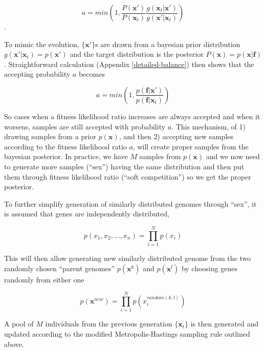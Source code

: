 \documentclass{article}
\begin{document}
\begin{equation}
  \label{mcmcsampling1}
  a = min(1, \frac{P(\mathbf{x}')}{P(\mathbf{x}_t)} \frac{g(\mathbf{x}_t|\mathbf{x}')}{g(\mathbf{x}'|\mathbf{x}_t)})
\end{equation}.

To mimic the evolution, $\{\mathbf{x}'\}$s are drawn from a bayesian prior distribution $g(\mathbf{x}'|\mathbf{x}_t) = p(\mathbf{x}')$ and the target distribution is the posterior $P(\mathbf{x}) = p(\mathbf{x}|\mathbf{f})$. Straightforward calculation (Appendix \ref{detailed-balance}) then shows that the accepting probability $a$ becomes

\begin{equation}
  \label{mcmcsampling2}
  a = min(1, \frac{p(\mathbf{f}|\mathbf{x}')}{p(\mathbf{f}|\mathbf{x}_t)})
\end{equation}

So cases when a fitness likelihood ratio increases are always accepted and when it worsens, samples are still accepted with probability $a$. This mechanism, of 1) drawing samples from a prior $p(\mathbf{x})$, and then 2) accepting new samples according to the fitness likelihood ratio $a$, will create proper samples from the bayesian posterior. In practice, we have $M$ samples from $p(\mathbf{x})$ and we now need to generate more samples (``sex'') having the same distribution and then put them through fitness likelihood ratio (``soft competition'') so we get the proper posterior.
 
To further simplify generation of similarly distributed genomes through ``sex'', it is assumed that genes are independently distributed,

\begin{equation}
  p(x_1,x_2,...,x_n) = \prod_{i=1}^{N}p(x_i)
\end{equation}

This will then allow generating new similarly distributed genome from the two randomly chosen ``parent genomes'' $p(\mathbf{x}^k)$ and $p(\mathbf{x}^l)$ by choosing genes randomly from either one

\begin{equation}
  p(\mathbf{x}^{new}) = \prod_{i=1}^{N}p(x_i^{random(k,l)})
\end{equation}

A pool of $M$ individuals from the previous generation $\{\mathbf{x}_t\}$ is then generated and updated according to the modified Metropolis-Hastings sampling rule outlined above.
\end{document}
